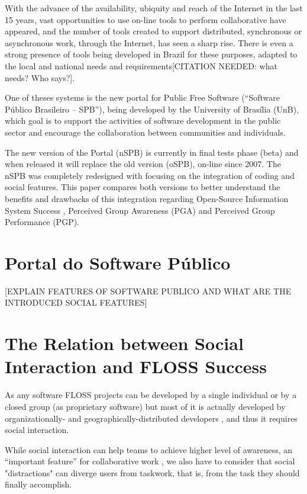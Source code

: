 \documentclass{sigchi}
\begin{document}
With the advance of the availability, ubiquity and reach of the Internet in the last 15 years, vast opportunities to use on-line tools to perform collaborative have appeared, and the number of tools created to support distributed, synchronous or asynchronous work, through the Internet, has seen a sharp rise. There is even a strong presence of tools being developed in Brazil for these purposes, adapted to the local and national needs and requirements[CITATION NEEDED: what needs? Who says?].

One of theses systems is the new portal for Public Free Software (``Software Público Brasileiro – SPB''), being developed by the University of Brasília (UnB), which goal is to support the activities of software development in the public sector and encourage the collaboration between communities and individuals.

The new version of the Portal (nSPB) is currently in final tests phase (beta) and when released it will replace the old version (oSPB), on-line since 2007. The nSPB was completely redesigned with focusing on the integration of coding and social features. This paper compares both versions to better understand the benefits and drawbacks of this integration regarding Open-Source Information System Success \cite{Crowston2006}, Perceived Group Awareness (PGA) \cite{Strijbos2007} and Perceived Group Performance (PGP)\cite{Jung2002}.

\section{Portal do Software Público}

[EXPLAIN FEATURES OF SOFTWARE PUBLICO AND WHAT ARE THE INTRODUCED SOCIAL FEATURES]

\section{The Relation between Social Interaction and FLOSS Success}

As any software FLOSS projects can be developed by a single individual or by a closed group (as proprietary software) but most of it is actually developed by organizationally- and geographically-distributed developers \cite{Crowston2012}, and thus it requires social interaction.

While social interaction can help teams to achieve higher level of awareness, an ``important feature'' for collaborative work \cite{Olson2000}, we also have to consider that social "distractions" can diverge users from taskwork, that is, from the task they should finally accomplish.
\end{document}
